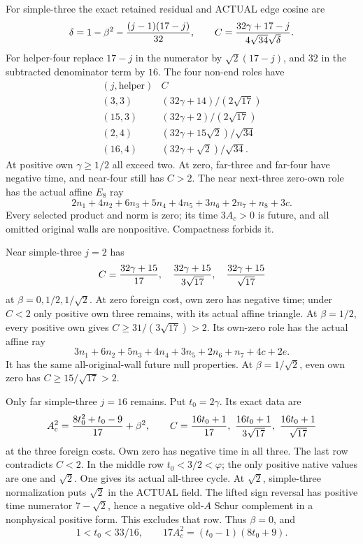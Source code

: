 \documentclass[11pt]{article}
\begin{document}
For simple-three the exact retained residual
and ACTUAL edge cosine are
\[
 \delta=1-\beta^2-{(j-1)(17-j)\over32},\qquad
 C={32\gamma+17-j\over4\sqrt{34}\sqrt\delta}.
\]
For helper-four replace \(17-j\) in
the numerator by \(\sqrt2(17-j)\), and
\(32\) in the subtracted denominator term
by \(16\).
The four non-end roles have
\[
 \begin{array}{c|c}
 (j,\text{helper})&C\\ \hline
 (3,3)&(32\gamma+14)/(2\sqrt{17})\\
 (15,3)&(32\gamma+2)/(2\sqrt{17})\\
 (2,4)&(32\gamma+15\sqrt2)/\sqrt{34}\\
 (16,4)&(32\gamma+\sqrt2)/\sqrt{34}.
 \end{array}
\]
At positive own \(\gamma\ge1/2\) all
exceed two.
At zero, far-three and far-four have
negative time, and near-four still
has \(C>2\).
The near next-three zero-own role has
the actual affine \(E_8\) ray
\[
              2n_1+4n_2+6n_3+5n_4+4n_5+3n_6+2n_7+n_8+3c .
\]
Every selected product and norm is zero;
its time \(3A_c>0\) is future, and
all omitted original walls are nonpositive.
Compactness forbids it.

Near simple-three \(j=2\) has
\[
 C={32\gamma+15\over17},\quad
   {32\gamma+15\over3\sqrt{17}},\quad
   {32\gamma+15\over\sqrt{17}}
\]
at \(\beta=0,1/2,1/\sqrt2\).
At zero foreign cost, own zero has
negative time; under \(C<2\) only
positive own three remains, with its
actual affine triangle.
At \(\beta=1/2\), every positive own
gives \(C\ge31/(3\sqrt{17})>2\).
Its own-zero role has the actual
affine ray
\[
                 3n_1+6n_2+5n_3+4n_4+3n_5+2n_6+n_7+4c+2e .
\]
It has the same all-original-wall future
null properties.
At \(\beta=1/\sqrt2\), even own zero
has \(C\ge15/\sqrt{17}>2\).

Only far simple-three \(j=16\) remains.
Put \(t_0=2\gamma\).
Its exact data are
\[
 A_c^2={8t_0^2+t_0-9\over17}+\beta^2,\qquad
 C={16t_0+1\over17},\
   {16t_0+1\over3\sqrt{17}},\
   {16t_0+1\over\sqrt{17}}
\]
at the three foreign costs.
Own zero has negative time in all three.
The last row contradicts \(C<2\).
In the middle row \(t_0<3/2<\varphi\);
the only positive native values are one
and \(\sqrt2\).
One gives its actual all-three cycle.
At \(\sqrt2\), simple-three normalization
puts \(\sqrt2\) in the ACTUAL field.
The lifted sign reversal has positive
time numerator \(7-\sqrt2\), hence a
negative old-\(A\) Schur complement in
a nonphysical positive form.
This excludes that row.
Thus \(\beta=0\), and
\[
                    1<t_0<33/16,\qquad
                    17A_c^2=(t_0-1)(8t_0+9).
\]
\end{document}
